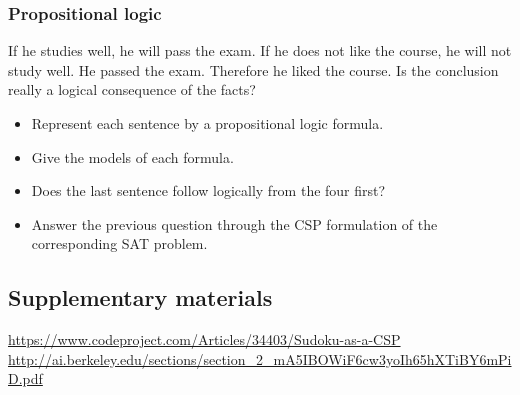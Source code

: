 \documentclass[a4paper, 10pt]{article}
\begin{document}
    \subsubsection{Propositional logic}
     If he studies well, he will pass the exam. If he does not like the course, he will not study well. He passed the exam. Therefore he
    liked the course.
    Is the conclusion really a logical consequence of the facts?
 \begin{itemize}
     \item Represent each sentence by a propositional logic formula.
     \item Give the models of each formula.
     \item Does the last sentence follow logically from the four first?
     \item Answer the previous question through the CSP formulation of the corresponding SAT problem.
 \end{itemize}
   \subsection{Supplementary materials}
   \url{https://www.codeproject.com/Articles/34403/Sudoku-as-a-CSP}\\
   \url{http://ai.berkeley.edu/sections/section_2_mA5IBOWiF6cw3yoIh65hXTiBY6mPiD.pdf}
\end{document}
